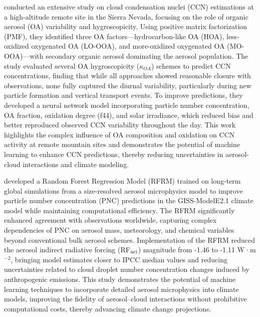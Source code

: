 \documentclass[11pt]{article}
\begin{document}
\citet{rejano2024ccn} conducted an extensive study on cloud condensation nuclei (CCN) estimations at a high-altitude remote site in the Sierra Nevada, focusing on the role of organic aerosol (OA) variability and hygroscopicity. Using positive matrix factorization (PMF), they identified three OA factors—hydrocarbon-like OA (HOA), less-oxidized oxygenated OA (LO-OOA), and more-oxidized oxygenated OA (MO-OOA)—with secondary organic aerosol dominating the aerosol population. The study evaluated several OA hygroscopicity (\(\kappa_{OA}\)) schemes to predict CCN concentrations, finding that while all approaches showed reasonable closure with observations, none fully captured the diurnal variability, particularly during new particle formation and vertical transport events. To improve predictions, they developed a neural network model incorporating particle number concentration, OA fraction, oxidation degree (f44), and solar irradiance, which reduced bias and better reproduced observed CCN variability throughout the day. This work highlights the complex influence of OA composition and oxidation on CCN activity at remote mountain sites and demonstrates the potential of machine learning to enhance CCN predictions, thereby reducing uncertainties in aerosol-cloud interactions and climate modeling.

\citet{yu2022use} developed a Random Forest Regression Model (RFRM) trained on long-term global simulations from a size-resolved aerosol microphysics model to improve particle number concentration (PNC) predictions in the GISS-ModelE2.1 climate model while maintaining computational efficiency. The RFRM significantly enhanced agreement with observations worldwide, capturing complex dependencies of PNC on aerosol mass, meteorology, and chemical variables beyond conventional bulk aerosol schemes. Implementation of the RFRM reduced the aerosol indirect radiative forcing (RF$_{\rm aci}$) magnitude from -1.46 to -1.11 W·m$^{-2}$, bringing model estimates closer to IPCC median values and reducing uncertainties related to cloud droplet number concentration changes induced by anthropogenic emissions. This study demonstrates the potential of machine learning techniques to incorporate detailed aerosol microphysics into climate models, improving the fidelity of aerosol–cloud interactions without prohibitive computational costs, thereby advancing climate change projections.
\end{document}
